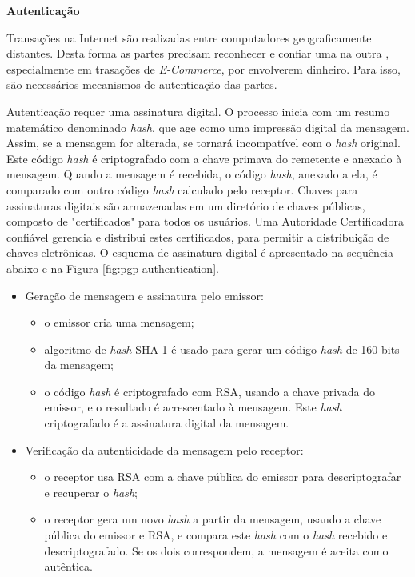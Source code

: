 \textbf{Autenticação}

Transações na Internet são realizadas entre computadores geograficamente distantes. Desta forma as partes precisam reconhecer e confiar uma na outra \cite{jiang2007line}, especialmente em trasações de \textit{E-Commerce}, por envolverem dinheiro. Para isso, são necessários mecanismos de autenticação das partes.

Autenticação requer uma assinatura digital. O processo inicia com um resumo matemático denominado \textit{hash}, que age como uma impressão digital da mensagem. Assim, se a mensagem for alterada, se tornará incompatível com o \textit{hash} original. Este código \textit{hash} é criptografado com a chave primava do remetente e anexado à mensagem. Quando a mensagem é recebida, o código \textit{hash}, anexado a ela, é comparado com outro código \textit{hash} calculado pelo receptor. Chaves para assinaturas digitais são armazenadas em um diretório de chaves públicas, composto de "certificados" para todos os usuários. \cite{al2008commerce} Uma Autoridade Certificadora confiável gerencia e distribui estes certificados, para permitir a distribuição de chaves eletrônicas. O esquema de assinatura digital é apresentado na sequência abaixo e na Figura \ref{fig:pgp-authentication}.

\begin{itemize}
\item Geração de mensagem e assinatura pelo emissor:
	\begin{itemize}
		\item o emissor cria uma mensagem;
		\item algoritmo de \textit{hash} SHA-1 é usado para gerar um código \textit{hash} de 160 bits da mensagem;
		\item o código \textit{hash} é criptografado com RSA, usando a chave privada do emissor, e o resultado é acrescentado à mensagem.
    {\color{red}Este \textit{hash} criptografado é a assinatura digital da mensagem.} 
	\end{itemize}

\item Verificação da autenticidade da mensagem pelo receptor:
	\begin{itemize}
		\item o receptor usa RSA com a chave pública do emissor para descriptografar e recuperar o \textit{hash};
		\item o receptor gera um novo \textit{hash} a partir da mensagem, usando a chave pública do emissor e {\color{red}RSA},
    e compara este \textit{hash} com o \textit{hash} recebido e descriptografado. 
    Se os dois correspondem, a mensagem é aceita como autêntica.
	\end{itemize}
\end{itemize}

